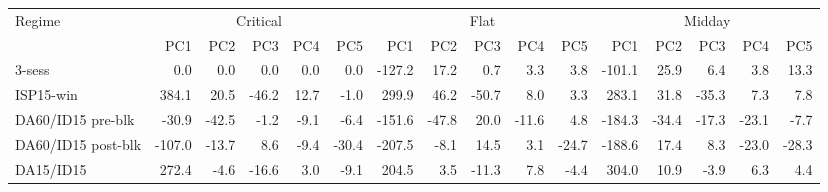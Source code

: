 \begin{tabular}{l r r r r r r r r r r r r r r r}
\toprule
Regime & \multicolumn{5}{c}{Critical} & \multicolumn{5}{c}{Flat} & \multicolumn{5}{c}{Midday} \\
\cmidrule(lr){2-6}\cmidrule(lr){7-11}\cmidrule(lr){12-16}
 & PC1 & PC2 & PC3 & PC4 & PC5 & PC1 & PC2 & PC3 & PC4 & PC5 & PC1 & PC2 & PC3 & PC4 & PC5 \\
\midrule
3-sess & 0.0 & 0.0 & 0.0 & 0.0 & 0.0 & -127.2 & 17.2 & 0.7 & 3.3 & 3.8 & -101.1 & 25.9 & 6.4 & 3.8 & 13.3 \\
ISP15-win & 384.1 & 20.5 & -46.2 & 12.7 & -1.0 & 299.9 & 46.2 & -50.7 & 8.0 & 3.3 & 283.1 & 31.8 & -35.3 & 7.3 & 7.8 \\
DA60/ID15 pre-blk & -30.9 & -42.5 & -1.2 & -9.1 & -6.4 & -151.6 & -47.8 & 20.0 & -11.6 & 4.8 & -184.3 & -34.4 & -17.3 & -23.1 & -7.7 \\
DA60/ID15 post-blk & -107.0 & -13.7 & 8.6 & -9.4 & -30.4 & -207.5 & -8.1 & 14.5 & 3.1 & -24.7 & -188.6 & 17.4 & 8.3 & -23.0 & -28.3 \\
DA15/ID15 & 272.4 & -4.6 & -16.6 & 3.0 & -9.1 & 204.5 & 3.5 & -11.3 & 7.8 & -4.4 & 304.0 & 10.9 & -3.9 & 6.3 & 4.4 \\
\bottomrule
\end{tabular}